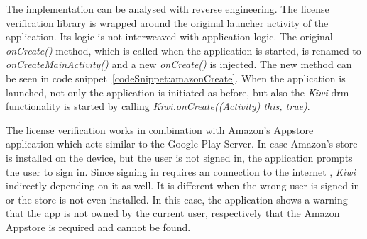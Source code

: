 The implementation can be analysed with reverse engineering.
The license verification library is wrapped around the original launcher activity of the application.
Its logic is not interweaved with application logic.
The original \textit{onCreate()} method, which is called when the application is started, is renamed to \textit{onCreateMainActivity()} and a new \textit{onCreate()} is injected.
The new method can be seen in code snippet~\ref{codeSnippet:amazonCreate}.
When the application is launched, not only the application is initiated as before, but also the \textit{Kiwi} \gls{drm} functionality is started by calling \textit{Kiwi.onCreate((Activity) this, true)}.
\newline

The license verification works in combination with Amazon's Appstore application which acts similar to the Google Play Server.
In case Amazon's store is installed on the device, but the user is not signed in, the application prompts the user to sign in.
Since signing in requires an connection to the internet , \textit{Kiwi} indirectly depending on it as well.
It is different when the wrong user is signed in or the store is not even installed.
In this case, the application shows a warning that the app is not owned by the current user, respectively that the Amazon Appstore is required and cannot be found.
